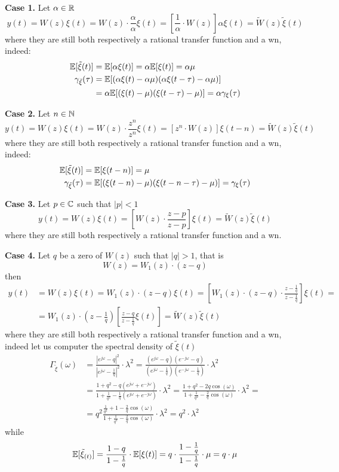 \textbf{Case 1.}
Let $\alpha \in \mathbb{R}$
\[
	y(t)=W(z) \xi(t)=W(z) \cdot \frac{\alpha}{\alpha} \xi(t)=\left[\frac{1}{\alpha} \cdot W(z)\right] \alpha \xi(t)=\tilde{W}(z) \tilde{\xi}(t)
\]
where they are still both respectively a rational transfer function and a \gls{wn}, indeed:
\begin{align*}
	\mathbb{E}[\tilde{\xi}(t)]&=\mathbb{E}[\alpha \xi(t)]=\alpha \mathbb{E}[\xi(t)]=\alpha \mu\\
	\gamma_{\tilde{\xi}}(\tau)&=\mathbb{E}[(\alpha\xi(t)-\alpha\mu)(\alpha \xi(t-\tau)-\alpha \mu)]\\
	&=\alpha \mathbb{E}[(\xi(t)-\mu)( \xi(t-\tau)- \mu)] = \alpha \gamma_{\xi}(\tau)
\end{align*}

\textbf{Case 2.}
Let $n \in \mathbb{N}$
\[
	y(t)=W(z) \xi(t)=W(z) \cdot \frac{z^{n}}{z^{n}} \xi(t)=\left[z^{n} \cdot W(z)\right] \xi(t-n)=\tilde{W}(z) \tilde{\xi}(t)
\]
where they are still both respectively a rational transfer function and a \gls{wn}, indeed:
\begin{align*}
	\mathbb{E}[\tilde{\xi}(t)]&=\mathbb{E}[\xi(t-n)]=\mu \\
	\gamma_{\tilde{\xi}}(\tau)&=\mathbb{E}[(\xi(t-n)-\mu)(\xi(t-n-\tau)-\mu)]=\gamma_{\xi}(\tau)
\end{align*}

\textbf{Case 3.}
Let $p \in \mathbb{C}$ such that $|p|<1$
\[
	y(t)=W(z) \xi(t)=\left[W(z) \cdot \frac{z-p}{z-p}\right] \xi(t)=\tilde{W}(z) \tilde{\xi}(t)
\]
where they are still both respectively a rational transfer function and a \gls{wn}.

\textbf{Case 4.}
Let $q$ be a zero of $W(z)$ such that $|q|>1$, that is
\[
	W(z)=W_{1}(z)\cdot(z-q)
\]
then
\begin{align*}
	y(t)&=W(z) \xi(t)=W_{1}(z) \cdot(z-q) \xi(t)=\left[W_{1}(z) \cdot(z-q) \cdot \frac{z-\frac{1}{q}}{z-\frac{1}{q}}\right] \xi(t)= \\
	&=W_{1}(z) \cdot\left(z-\frac{1}{q}\right)\left[\frac{z-q}{z-\frac{1}{q}} \xi(t)\right]=\tilde{W}(z) \tilde{\xi}(t)
\end{align*}
where they are still both respectively a rational transfer function and a \gls{wn}, indeed let us computer the spectral density of $\tilde{\xi}(t)$
\begin{align*}
	\Gamma_{\tilde\xi}(\omega) &=\frac{\left|e^{j \omega}-q\right|^{2}}{\left|e^{j \omega}-\frac{1}{q}\right|^{2}} \cdot \lambda^{2}=\frac{\left(e^{j \omega}-q\right)\left(e^{-j \omega}-q\right)}{\left(e^{j \omega}-\frac{1}{q}\right)\left(e^{-j \omega}-\frac{1}{q}\right)} \cdot \lambda^{2}\\
	&=\frac{1+q^{2}-q\left(e^{j \omega}+e^{-j \omega}\right)}{1+\frac{1}{q^{2}}-\frac{1}{q}\left(e^{j \omega}+e^{-j \omega}\right)} \cdot \lambda^{2}=\frac{1+q^{2}-2 q \cos (\omega)}{1+\frac{1}{q^{2}}-\frac{2}{q} \cos (\omega)} \cdot \lambda^{2}=\\
	&=q^{2} \frac{\frac{1}{q^{2}}+1-\frac{2}{q} \cos (\omega)}{1+\frac{1}{q^{2}}-\frac{2}{q} \cos (\omega)} \cdot \lambda^{2}=q^{2} \cdot \lambda^{2}
\end{align*}
while
\[
	\mathbb{E}[\tilde{\xi}_{(t)}]=\frac{1-q}{1-\frac{1}{q}} \cdot \mathbb{E}[\xi(t)]=q \cdot \frac{1-\frac{1}{q}}{1-\frac{1}{q}} \cdot \mu=q \cdot \mu
\]